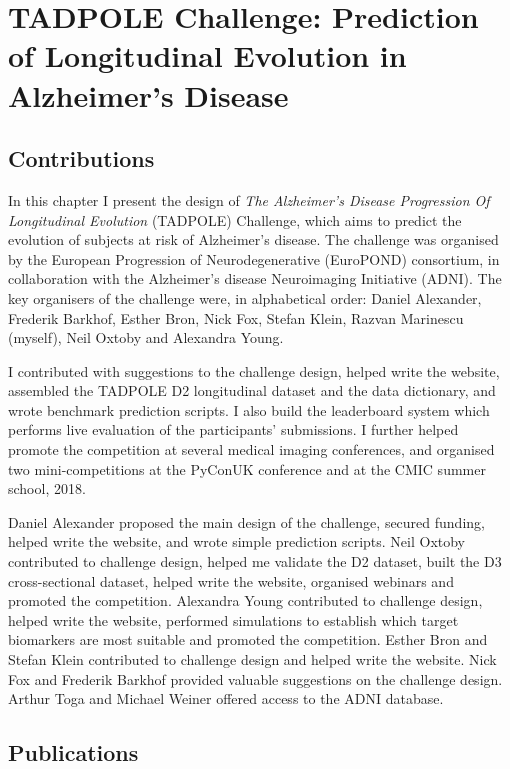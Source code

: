 \chapter[TADPOLE Challenge: Prediction of Evolution in Alzheimer's Disease]{TADPOLE Challenge: Prediction of Longitudinal Evolution in Alzheimer's Disease}
\label{chapter:tadpole}


\section{Contributions}

In this chapter I present the design of \emph{The Alzheimer's Disease Progression Of Longitudinal Evolution} (TADPOLE) Challenge, which aims to predict the evolution of subjects at risk of Alzheimer's disease. The challenge was organised by the European Progression of Neurodegenerative (EuroPOND) consortium, in collaboration with the Alzheimer's disease Neuroimaging Initiative (ADNI). The key organisers of the challenge were, in alphabetical order: Daniel Alexander, Frederik Barkhof, Esther Bron, Nick Fox, Stefan Klein, Razvan Marinescu (myself), Neil Oxtoby and Alexandra Young. 

I contributed with suggestions to the challenge design, helped write the website, assembled the TADPOLE D2 longitudinal dataset and the data dictionary, and wrote benchmark prediction scripts. I also build the leaderboard system which performs live evaluation of the participants' submissions. I further helped promote the competition at several medical imaging conferences, and organised two mini-competitions at the PyConUK conference and at the CMIC summer school, 2018. 

Daniel Alexander proposed the main design of the challenge, secured funding, helped write the website, and wrote simple prediction scripts. Neil Oxtoby contributed to challenge design, helped me validate the D2 dataset, built the D3 cross-sectional dataset, helped write the website, organised webinars and promoted the competition. Alexandra Young contributed to challenge design, helped write the website, performed simulations to establish which target biomarkers are most suitable and promoted the competition. Esther Bron and Stefan Klein contributed to challenge design and helped write the website. Nick Fox and Frederik Barkhof provided valuable suggestions on the challenge design. Arthur Toga and Michael Weiner offered access to the ADNI database. 

\section{Publications}

